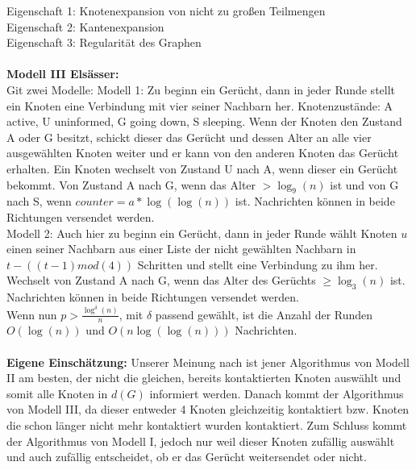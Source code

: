 \documentclass[12pt,a4paper]{report}
\begin{document}
Eigenschaft 1: Knotenexpansion von nicht zu großen Teilmengen\\
Eigenschaft 2: Kantenexpansion\\
Eigenschaft 3: Regularität des Graphen
\\
\\
\textbf{Modell III Elsässer:}\\
Git zwei Modelle: Modell 1: Zu beginn ein Gerücht, dann in jeder Runde stellt ein Knoten eine Verbindung mit vier seiner Nachbarn her. Knotenzustände: A active, U uninformed, G going down, S sleeping. Wenn der Knoten den Zustand A oder G besitzt, schickt dieser das Gerücht und dessen Alter an alle vier ausgewählten Knoten weiter und er kann von den anderen Knoten das Gerücht erhalten. Ein Knoten wechselt von Zustand U nach A, wenn dieser ein Gerücht bekommt.
Von Zustand A nach G, wenn das Alter $>\log_9(n)$ ist und von G nach S, wenn $counter = a*\log(\log(n))$ ist. Nachrichten können in beide Richtungen versendet werden.\\
Modell 2: Auch hier zu beginn ein Gerücht, dann in jeder Runde wählt Knoten $u$ einen seiner Nachbarn aus einer Liste der nicht gewählten Nachbarn in $t-((t-1)mod(4))$ Schritten und stellt eine Verbindung zu ihm her. Wechselt von Zustand A nach G, wenn das Alter des Gerüchts $\ge \log_3(n)$ ist. Nachrichten können in beide Richtungen versendet werden.\\
Wenn nun $p>\frac{\log^{\delta}(n)}{n}$, mit $\delta$ passend gewählt, ist die Anzahl der Runden $O(\log(n))$ und $O(n\log(\log(n)))$ Nachrichten.
\\
\\
\textbf{Eigene Einschätzung:} Unserer Meinung nach ist jener Algorithmus von Modell II am besten, der nicht die gleichen, bereits kontaktierten Knoten auswählt und somit alle Knoten in $d(G)$ informiert werden. Danach kommt der Algorithmus von Modell III, da dieser entweder 4 Knoten gleichzeitig kontaktiert bzw. Knoten die schon länger nicht mehr kontaktiert wurden kontaktiert. Zum Schluss kommt der Algorithmus von Modell I, jedoch nur weil dieser Knoten zufällig auswählt und auch zufällig entscheidet, ob er das Gerücht weitersendet oder nicht.
\end{document}
